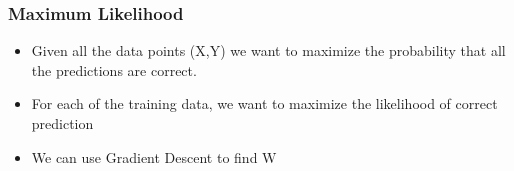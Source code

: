 \subsubsection{Maximum Likelihood}
\begin{itemize}
    \item Given all the data points (X,Y) we want to maximize the probability that all the predictions are correct.
    \item For each of the training data, we want to maximize the likelihood of correct prediction
    \item We can use Gradient Descent to find W
\end{itemize}